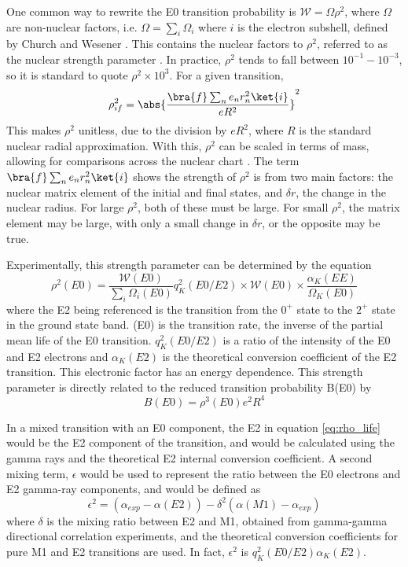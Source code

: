 One common way to rewrite the E0 transition probability is 
$\mathcal{W}=\Omega\rho^2$, where $\Omega$ are non-nuclear factors, i.e. $\Omega=\sum_i\Omega_i$ where $i$ is the electron subshell, defined by Church and Wesener \citep{church58:_monopole}. This contains the nuclear factors to $\rho^2$, referred to as the nuclear strength parameter \citep{church56:_monopole,wood99:_e0}. In practice, $\rho^2$ tends to fall between $10^{-1}-10^{-3}$, so it is standard to quote $\rho^2\times10^3$. For a given transition, \begin{equation}
    \rho^2_{if}=\abs{\frac{\bra{f}\sum_ne_nr_n^2\ket{i}}{eR^2}}^2
\end{equation}
This makes $\rho^2$ unitless, due to the division by $eR^2$, where $R$ is the standard nuclear radial approximation. With this, $\rho^2$ can be scaled in terms of mass, allowing for comparisons across the nuclear chart \citep{wood99:_e0}. The term $\bra{f}\sum_ne_nr_n^2\ket{i}$ shows the strength of $\rho^2$ is from two main factors: the nuclear matrix element of the initial and final states, and $\delta r$, the change in the nuclear radius. For large $\rho^2$, both of these must be large. For small $\rho^2$, the matrix element may be large, with only a small change in $\delta r$, or the opposite may be true.

Experimentally, this strength parameter can be determined by the equation
\begin{equation}
\label{eq:rho_life}
    \rho^2(E0)=\frac{\mathcal{W}(E0)}{\sum_i\Omega_i(E0)}q_K^2(E0/E2)\times\mathcal{W}(E0)\times\frac{\alpha_K(EE)}{\Omega_K(E0)}
\end{equation}
where the E2 being referenced is the transition from the $0^+$ state to the $2^+$ state in the ground state band. (E0) is the transition rate, the inverse of the partial mean life of the E0 transition. $q_K^2(E0/E2)$ is a ratio of the intensity of the E0 and E2 electrons and $\alpha_K(E2)$ is the theoretical conversion coefficient of the E2 transition. This electronic factor has an energy dependence. This strength parameter is directly related to the reduced transition probability B(E0) by
\begin{equation}
\label{eq:BE0}
    B(E0)=\rho^3(E0)e^2R^4
\end{equation}

In a mixed transition with an E0 component, the E2 in equation \ref{eq:rho_life} would be the E2 component of the transition, and would be calculated using the gamma rays and the theoretical E2 internal conversion coefficient\citep{church58:_monopole}. A second mixing term, $\epsilon$ would be used to represent the ratio between the E0 electrons and E2 gamma-ray components, and would be defined as 
\begin{equation}
\label{eq:epsilon}
    \epsilon^2=(\alpha_{exp}-\alpha(E2))-\delta^2(\alpha(M1)-\alpha_{exp})
\end{equation}
where $\delta$ is the mixing ratio between E2 and M1, obtained from gamma-gamma directional correlation experiments, and the theoretical conversion coefficients for pure M1 and E2 transitions are used. In fact, $\epsilon^2$ is $q_K^2(E0/E2)\alpha_K(E2)$. 

